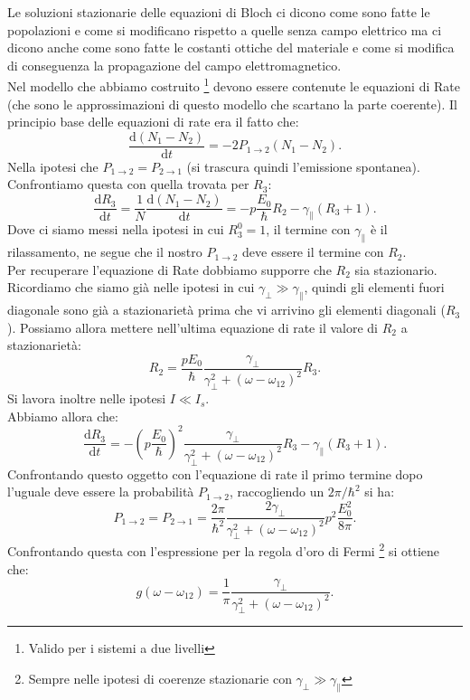 Le soluzioni stazionarie delle equazioni di Bloch ci dicono come sono fatte le popolazioni e come si modificano rispetto a quelle senza campo elettrico ma ci dicono anche come sono fatte le costanti ottiche del materiale e come si modifica di conseguenza la propagazione del campo elettromagnetico.\\
Nel modello che abbiamo costruito
\footnote{Valido per i sistemi a due livelli} devono essere contenute le equazioni di Rate (che sono le approssimazioni di questo modello che scartano la parte coerente). Il principio base delle equazioni di rate era il fatto che:
\[
    \frac{\text{d} \left(N_1-N_2\right)}{\text{d} t} = 
    -2 P_{1\to 2}\left(N_1-N_2\right)
.\] 
Nella ipotesi che $P_{1\to 2}= P_{2\to 1}$ (si trascura quindi l'emissione spontanea). Confrontiamo questa con quella trovata per $R_3$:
\[
\frac{\text{d} R_3}{\text{d} t} =
\frac{1}{N} \frac{\text{d} \left(N_1-N_2\right)}{\text{d} t} =
- p \frac{E_0}{\hbar }R_2-\gamma_\parallel\left(R_3+1\right)
.\] 
Dove ci siamo messi nella ipotesi in cui $R_3^0 = 1$, il termine con $\gamma_\parallel$ è il rilassamento, ne segue che il nostro $P_{1\to 2}$ deve essere il termine con $R_2$.\\
Per recuperare l'equazione di Rate dobbiamo supporre che $R_2$ sia stazionario.
Ricordiamo che siamo già nelle ipotesi in cui $\gamma_\perp\gg\gamma_\parallel$, quindi gli elementi fuori diagonale sono già a stazionarietà prima che vi arrivino gli elementi diagonali ($R_3$). Possiamo allora mettere nell'ultima equazione di rate il valore di $R_2$ a stazionarietà:
\[
    R_2 = \frac{pE_0}{\hbar } 
    \frac{\gamma_\perp}{\gamma_\perp^2 + \left(\omega-\omega_{12}\right)^2}R_3
.\] 
Si lavora inoltre nelle ipotesi $I\ll I_s$.\\
Abbiamo allora che:
\[
\frac{\text{d} R_3}{\text{d} t} =
-\left(p \frac{E_0}{\hbar }\right)^2 
\frac{\gamma_\perp}
{\gamma_\perp^2+\left(\omega-\omega_{12}\right)^2}
R_3-\gamma_\parallel\left(R_3+1\right)
.\] 
Confrontando questo oggetto con l'equazione di rate il primo termine dopo l'uguale deve essere la probabilità $P_{1\to 2}$, raccogliendo un $2\pi /\hbar ^2$ si ha:
\[
    P_{1\to 2}=P_{2\to 1} =
    \frac{2\pi}{\hbar ^2} 
    \frac{2\gamma_\perp}
    {\gamma_\perp^2+\left(\omega-\omega_{12}\right)^2}
    p^2 \frac{E_0^2}{8\pi}
.\] 
Confrontando questa con l'espressione per la regola d'oro di Fermi
\footnote{Sempre nelle ipotesi di coerenze stazionarie con $\gamma_\perp\gg\gamma_\parallel$}
 si ottiene che:
\[
    g(\omega-\omega_{12}) = \frac{1}{\pi}
    \frac{\gamma_\perp}
    {\gamma_\perp^2+\left(\omega-\omega_{12}\right)^2}
.\] 

